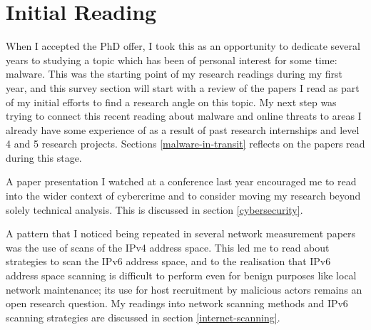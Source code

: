 \documentclass[10pt,sigconf]{acmart}
\begin{document}
\section{Initial Reading}

When I accepted the PhD offer, I took this as an opportunity to dedicate several years to studying a topic which has been of personal interest for some time: malware.
This was the starting point of my research readings during my first year, and this survey section will start with a review of the papers I read as part of my initial efforts to find a research angle on this topic.
My next step was trying to connect this recent reading about malware and online threats to areas I already have some experience of as a result of past research internships and level 4 and 5 research projects.
Sections \ref{malware-in-transit} reflects on the papers read during this stage.

A paper presentation I watched at a conference last year encouraged me to read into the wider context of cybercrime and to consider moving my research beyond solely technical analysis.
This is discussed in section \ref{cybersecurity}.

A pattern that I noticed being repeated in several network measurement papers was the use of scans of the IPv4 address space.
This led me to read about strategies to scan the IPv6 address space, and to the realisation that IPv6 address space scanning is difficult to perform even for benign purposes like local network maintenance;
its use for host recruitment by malicious actors remains an open research question.
My readings into network scanning methods and IPv6 scanning strategies are discussed in section \ref{internet-scanning}.
\end{document}
